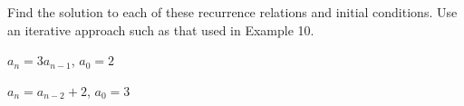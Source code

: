 
%
%
%

	Find the solution to each of these recurrence relations and initial conditions.
	Use an iterative approach such as that used in Example 10.
	\begin{subproblem}
		\item $a_n = 3a_{n-1}$, $a_0 = 2$
		\item $a_n = a_{n-2} + 2$, $a_0 = 3$
	\end{subproblem}

\solution
	\begin{subproblem}
		\item 
		\item 
	\end{subproblem}
